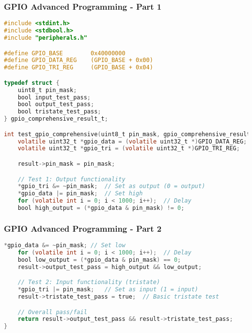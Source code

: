 \documentclass{beamer}
\begin{document}
\begin{frame}[fragile]
\frametitle{GPIO Advanced Programming - Part 1}
\begin{lstlisting}[language=C, basicstyle=\fontsize{5}{2}\selectfont\ttfamily, backgroundcolor={}]
#include <stdint.h>
#include <stdbool.h>
#include "peripherals.h"

#define GPIO_BASE        0x40000000
#define GPIO_DATA_REG    (GPIO_BASE + 0x00)
#define GPIO_TRI_REG     (GPIO_BASE + 0x04)

typedef struct {
    uint8_t pin_mask;
    bool input_test_pass;
    bool output_test_pass;
    bool tristate_test_pass;
} gpio_comprehensive_result_t;

int test_gpio_comprehensive(uint8_t pin_mask, gpio_comprehensive_result_t *result) {
    volatile uint32_t *gpio_data = (volatile uint32_t *)GPIO_DATA_REG;
    volatile uint32_t *gpio_tri = (volatile uint32_t *)GPIO_TRI_REG;

    result->pin_mask = pin_mask;

    // Test 1: Output functionality
    *gpio_tri &= ~pin_mask;  // Set as output (0 = output)
    *gpio_data |= pin_mask;  // Set high
    for (volatile int i = 0; i < 1000; i++);  // Delay
    bool high_output = (*gpio_data & pin_mask) != 0;
\end{lstlisting}
\end{frame}

\begin{frame}[fragile]
\frametitle{GPIO Advanced Programming - Part 2}
\begin{lstlisting}[language=C, basicstyle=\fontsize{5}{2}\selectfont\ttfamily, backgroundcolor={}]
    *gpio_data &= ~pin_mask; // Set low
    for (volatile int i = 0; i < 1000; i++);  // Delay
    bool low_output = (*gpio_data & pin_mask) == 0;
    result->output_test_pass = high_output && low_output;

    // Test 2: Input functionality (tristate)
    *gpio_tri |= pin_mask;   // Set as input (1 = input)
    result->tristate_test_pass = true;  // Basic tristate test

    // Overall pass/fail
    return result->output_test_pass && result->tristate_test_pass;
}
\end{lstlisting}
\end{frame}
\end{document}

